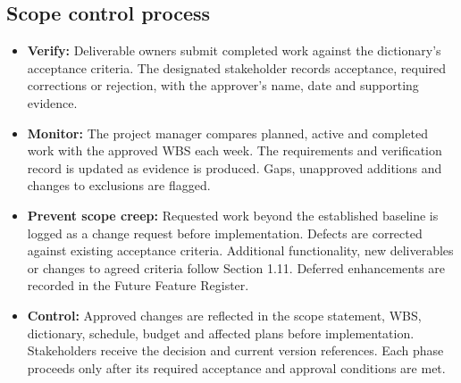 \subsection{Scope control process}\label{sec:1.10}
\begin{itemize}
\item \textbf{Verify:} Deliverable owners submit completed work against the dictionary's acceptance criteria. The designated stakeholder records acceptance, required corrections or rejection, with the approver's name, date and supporting evidence.
\item \textbf{Monitor:} The project manager compares planned, active and completed work with the approved WBS each week. The requirements and verification record is updated as evidence is produced. Gaps, unapproved additions and changes to exclusions are flagged.
\item \textbf{Prevent scope creep:} Requested work beyond the established baseline is logged as a change request before implementation. Defects are corrected against existing acceptance criteria. Additional functionality, new deliverables or changes to agreed criteria follow Section 1.11. Deferred enhancements are recorded in the Future Feature Register.
\item \textbf{Control:} Approved changes are reflected in the scope statement, WBS, dictionary, schedule, budget and affected plans before implementation. Stakeholders receive the decision and current version references. Each phase proceeds only after its required acceptance and approval conditions are met.
\end{itemize}


